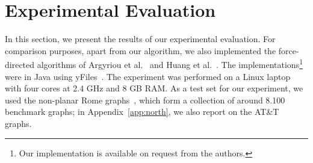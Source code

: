 \documentclass[runningheads]{llncs}
\begin{document}


\section{Experimental Evaluation}
\label{sec:experiments}

In this section, we present the results of our experimental evaluation. For comparison purposes, apart from our algorithm, we also implemented the force-directed algorithms of Argyriou et al.~\cite{DBLP:journals/cj/ArgyriouBS13} and Huang et al.~\cite{DBLP:journals/vlc/HuangEHL13}. The implementations\footnote{Our implementation is available on request from the authors.} were in Java using yFiles~\cite{DBLP:books/sp/04/WieseE004}. The experiment was performed on a Linux laptop with four cores at 2.4 GHz and 8 GB RAM.
%
As a test set for our experiment, we used the non-planar Rome graphs~\cite{DBLP:reference/crc/BattistaD13}, which form a collection of around 8.100 benchmark graphs; in Appendix~\ref{app:north}, we also report on the AT\&T graphs.
\end{document}
